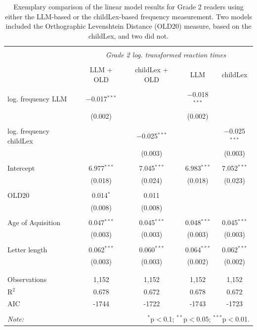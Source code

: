 \documentclass[doc, a4paper]{apa7}
\begin{document}
\begin{table}[!htbp] \centering 
  \caption{Exemplary comparison of the linear model results for Grade 2 readers using either the LLM-based or the childLex-based frequency measurement. Two models included the Orthographic Levenshtein Distance (OLD20) measure, based on the childLex, and two did not.} 
  \label{G2stats} 
\begin{tabular}{@{\extracolsep{5pt}}lcccc} 
\\[-1.8ex]\hline 
\hline \\[-1.8ex] 
 & \multicolumn{4}{c}{\textit{Grade 2 log. transformed reaction times}} \\ 
\cline{2-5} 
\\[-1.8ex] & LLM + OLD & childLex + OLD & LLM & childLex\\ 
\hline \\[-1.8ex] 
log. frequency LLM & $-$0.017$^{***}$ &  & $-$0.018$^{***}$ &  \\ 
  & (0.002) &  & (0.002) &  \\ 
  & & & & \\ 
 log. frequency childLex &  & $-$0.025$^{***}$ &  & $-$0.025$^{***}$ \\ 
  &  & (0.003) &  & (0.003) \\ 
  & & & & \\
  Intercept & 6.977$^{***}$ & 7.045$^{***}$ & 6.983$^{***}$ & 7.052$^{***}$ \\ 
  & (0.018) & (0.024) & (0.018) & (0.023) \\ 
  & & & & \\ 
  OLD20 & 0.014$^{*}$ & 0.011 &  &  \\ 
  & (0.008) & (0.008) &  &  \\ 
  & & & & \\ 
 Age of Aquisition & 0.047$^{***}$ & 0.045$^{***}$ & 0.048$^{***}$ & 0.045$^{***}$ \\ 
  & (0.003) & (0.003) & (0.003) & (0.003) \\ 
  & & & & \\ 
 Letter length & 0.062$^{***}$ & 0.060$^{***}$ & 0.064$^{***}$ & 0.062$^{***}$ \\ 
  & (0.003) & (0.003) & (0.002) & (0.002) \\ 
  & & & & \\  
\hline \\[-1.8ex] 
Observations & 1,152 & 1,152 & 1,152 & 1,152 \\ 
R$^{2}$ & 0.678 & 0.672 & 0.678 & 0.672 \\ 
AIC & -1744 & -1722 & -1743 & -1723 \\ 

\hline 
\hline \\[-1.8ex] 
\textit{Note:}  & \multicolumn{4}{r}{$^{*}$p$<$0.1; $^{**}$p$<$0.05; $^{***}$p$<$0.01.} \\ 
\end{tabular} 
\end{table} 
\end{document}
